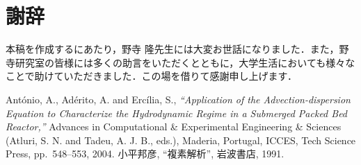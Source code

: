 \documentclass[a4paper,12pt]{nodlabpabw}
\begin{document}
\chapter*{謝辞}
本稿を作成するにあたり，野寺 隆先生には大変お世話になりました．また，野寺研究室の皆様には多くの助言をいただくとともに，大学生活においても様々なことで助けていただきました．この場を借りて感謝申し上げます．
%
\begin{thebibliography}{99}


Ant\'{o}nio, A., Ad\'{e}rito, A. and Erc\'{i}lia, S., \textsl{``Application of the Advection-dispersion Equation to Characterize the Hydrodynamic Regime in a Submerged Packed Bed Reactor,''} Advances in Computational \& Experimental Engineering \& Sciences (Atluri, S. N. and Tadeu, A. J. B.,
eds.), Maderia, Portugal, ICCES, Tech Science Press, pp.\ 548--553, 2004.
小平邦彦, ``複素解析'', 岩波書店, 1991.
\end{thebibliography}
\end{document}
